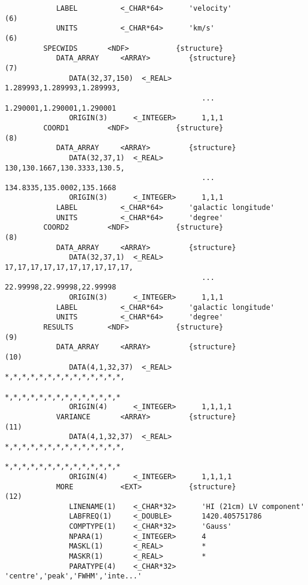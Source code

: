 \begin{verbatim}
            LABEL          <_CHAR*64>      'velocity'                       (6)
            UNITS          <_CHAR*64>      'km/s'                           (6)
         SPECWIDS       <NDF>           {structure}
            DATA_ARRAY     <ARRAY>         {structure}                      (7)
               DATA(32,37,150)  <_REAL>       1.289993,1.289993,1.289993,
                                              ... 1.290001,1.290001,1.290001
               ORIGIN(3)      <_INTEGER>      1,1,1
         COORD1         <NDF>           {structure}                         (8)
            DATA_ARRAY     <ARRAY>         {structure}
               DATA(32,37,1)  <_REAL>         130,130.1667,130.3333,130.5,
                                              ... 134.8335,135.0002,135.1668
               ORIGIN(3)      <_INTEGER>      1,1,1
            LABEL          <_CHAR*64>      'galactic longitude'
            UNITS          <_CHAR*64>      'degree'
         COORD2         <NDF>           {structure}                         (8)
            DATA_ARRAY     <ARRAY>         {structure}
               DATA(32,37,1)  <_REAL>         17,17,17,17,17,17,17,17,17,17,
                                              ... 22.99998,22.99998,22.99998
               ORIGIN(3)      <_INTEGER>      1,1,1
            LABEL          <_CHAR*64>      'galactic longitude'
            UNITS          <_CHAR*64>      'degree'
         RESULTS        <NDF>           {structure}                         (9)
            DATA_ARRAY     <ARRAY>         {structure}                     (10)
               DATA(4,1,32,37)  <_REAL>       *,*,*,*,*,*,*,*,*,*,*,*,*,*,
                                              *,*,*,*,*,*,*,*,*,*,*,*,*,*
               ORIGIN(4)      <_INTEGER>      1,1,1,1
            VARIANCE       <ARRAY>         {structure}                     (11)
               DATA(4,1,32,37)  <_REAL>       *,*,*,*,*,*,*,*,*,*,*,*,*,*,
                                              *,*,*,*,*,*,*,*,*,*,*,*,*,*
               ORIGIN(4)      <_INTEGER>      1,1,1,1
            MORE           <EXT>           {structure}                     (12)
               LINENAME(1)    <_CHAR*32>      'HI (21cm) LV component'
               LABFREQ(1)     <_DOUBLE>       1420.405751786
               COMPTYPE(1)    <_CHAR*32>      'Gauss'
               NPARA(1)       <_INTEGER>      4
               MASKL(1)       <_REAL>         *
               MASKR(1)       <_REAL>         *
               PARATYPE(4)    <_CHAR*32>      'centre','peak','FWHM','inte...'
\end{verbatim}
\normalsize

